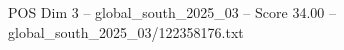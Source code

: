 \begin{textsample}{POS Dim 3 – global\_south\_2025\_03 – Score 34.00 – global\_south\_2025\_03/122358176.txt}
\end{textsample}
